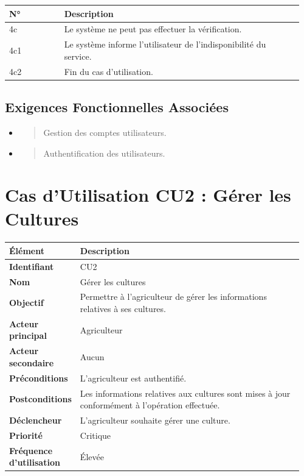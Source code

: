 \begin{longtable}{@{}p{0.18\linewidth}p{0.78\linewidth}@{}}
\toprule
\rowcolors{2}{gray!10}{white}
\textbf{N°} & \textbf{Description} \\
\midrule
\endhead
4c & Le système ne peut pas effectuer la vérification. \\
4c1 & Le système informe l'utilisateur de l'indisponibilité du
service. \\
4c2 & Fin du cas d'utilisation. \\
\bottomrule
\end{longtable}

\hypertarget{exigences-fonctionnelles-associuxe9es}{%
\subsection{Exigences Fonctionnelles
Associées}\label{exigences-fonctionnelles-associuxe9es}}

\begin{itemize}
\item
  \begin{quote}
  Gestion des comptes utilisateurs.
  \end{quote}
\item
  \begin{quote}
  Authentification des utilisateurs.
  \end{quote}
\end{itemize}

\hypertarget{cas-dutilisation-cu2-guxe9rer-les-cultures}{%
\section{Cas d'Utilisation CU2 : Gérer les
Cultures}\label{cas-dutilisation-cu2-guxe9rer-les-cultures}}

\begin{longtable}{@{}p{0.18\linewidth}p{0.78\linewidth}@{}}
\toprule
\rowcolors{2}{gray!10}{white}
\textbf{Élément} & \textbf{Description} \\
\midrule
\endhead
\textbf{Identifiant} & CU2 \\
\textbf{Nom} & Gérer les cultures \\
\textbf{Objectif} & Permettre à l'agriculteur de gérer les informations
relatives à ses cultures. \\
\textbf{Acteur principal} & Agriculteur \\
\textbf{Acteur secondaire} & Aucun \\
\textbf{Préconditions} & L'agriculteur est authentifié. \\
\textbf{Postconditions} & Les informations relatives aux cultures sont
mises à jour conformément à l'opération effectuée. \\
\textbf{Déclencheur} & L'agriculteur souhaite gérer une culture. \\
\textbf{Priorité} & Critique \\
\textbf{Fréquence d'utilisation} & Élevée \\
\bottomrule
\end{longtable}

